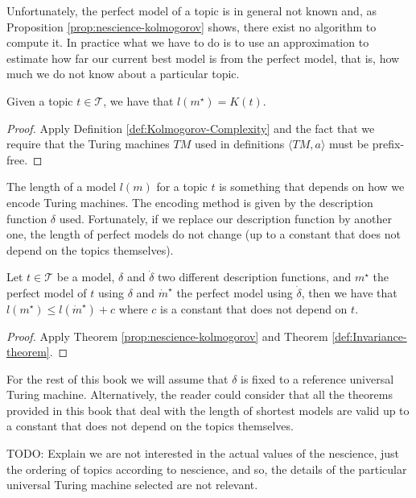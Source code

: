 Unfortunately, the perfect model of a topic is in general not known and, as Proposition \ref{prop:nescience-kolmogorov} shows, there exist no algorithm to compute it. In practice what we have to do is to use an approximation to estimate how far our current best model is from the perfect model, that is, how much we do not know about a particular topic.

\begin{proposition}
\label{prop:nescience-kolmogorov}
Given a topic $t \in \mathcal{T}$, we have that $l \left(m^{\star} \right) = K\left( t \right)$.
\end{proposition}
\begin{proof}
Apply Definition \ref{def:Kolmogorov-Complexity} and the fact that we require that the Turing machines $TM$ used in definitions $\langle TM,a\rangle$ must be prefix-free.
\end{proof}

The length of a model $l \left( m \right)$ for a topic $t$ is something that depends on how we encode Turing machines. The encoding method is given by the description function $\delta$ used. Fortunately, if we replace our description function by another one, the length of perfect models do not change (up to a constant that does not depend on the topics themselves).

\begin{corollary}
Let $t \in \mathcal{T}$ be a model, $\delta$ and $\dot{\delta}$ two different description functions, and $m^{\star}$ the perfect model of $t$ using $\delta$ and $\dot{m}^{\star}$ the perfect model using $\dot{\delta}$, then we have that $l \left( m^{\star} \right) \leq l \left( \dot{m}^{\star} \right) + c$ where $c$ is a constant that does not depend on $t$.
\end{corollary}
\begin{proof}
Apply Theorem \ref{prop:nescience-kolmogorov} and Theorem \ref{def:Invariance-theorem}.
\end{proof}

For the rest of this book we will assume that $\delta$ is fixed to a reference universal Turing machine. Alternatively, the reader could consider that all the theorems provided in this book that deal with the length of shortest models are valid up to a constant that does not depend on the topics themselves.

{\color{red} TODO: Explain we are not interested in the actual values of the nescience, just the ordering of topics according to nescience, and so, the details of the particular universal Turing machine selected are not relevant.}

